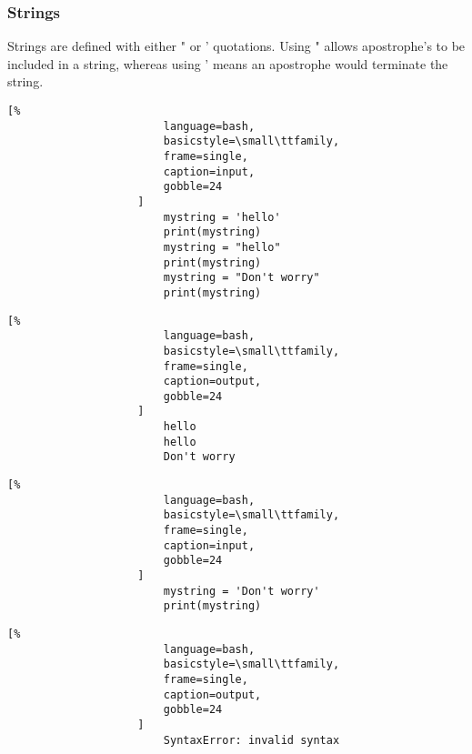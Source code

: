 \documentclass[crop=false,class=book]{standalone}
\begin{document}
            \subsubsection{Strings}
                Strings are defined with either " or ' quotations.
                Using " allows apostrophe's to be included
                in a string, whereas using ' means an apostrophe
                would terminate the string.\newline
                \begin{minipage}[t]{.48\textwidth}
                    \centering
                    \begin{lstlisting}[%
                        language=bash,
                        basicstyle=\small\ttfamily,
                        frame=single,
                        caption=input,
                        gobble=24
                    ]
                        mystring = 'hello'
                        print(mystring)
                        mystring = "hello"
                        print(mystring)
                        mystring = "Don't worry"
                        print(mystring)
                    \end{lstlisting}
                \end{minipage}\hfill
                \begin{minipage}[t]{.48\textwidth}
                    \centering
                    \begin{lstlisting}[%
                        language=bash,
                        basicstyle=\small\ttfamily,
                        frame=single,
                        caption=output,
                        gobble=24
                    ]
                        hello
                        hello
                        Don't worry
                    \end{lstlisting}
                \end{minipage}
                \begin{minipage}[t]{.48\textwidth}
                    \centering
                    \begin{lstlisting}[%
                        language=bash,
                        basicstyle=\small\ttfamily,
                        frame=single,
                        caption=input,
                        gobble=24
                    ]
                        mystring = 'Don't worry'
                        print(mystring)
                    \end{lstlisting}
                \end{minipage}\hfill
                \begin{minipage}[t]{.48\textwidth}
                    \centering
                    \begin{lstlisting}[%
                        language=bash,
                        basicstyle=\small\ttfamily,
                        frame=single,
                        caption=output,
                        gobble=24
                    ]
                        SyntaxError: invalid syntax
                    \end{lstlisting}
                \end{minipage}
\end{document}
